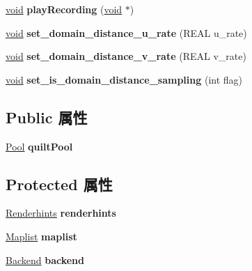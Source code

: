 \begin{DoxyCompactItemize}
\mbox{\label{class_nurbs_tessellator_af11cca8f0872b96b47293b6f3d2e7e24}} 
\hyperlink{interfacevoid}{void} {\bfseries play\+Recording} (\hyperlink{interfacevoid}{void} $\ast$)
\item 
\mbox{\label{class_nurbs_tessellator_abe08fb7d023c4ba7409fba609c70cad8}} 
\hyperlink{interfacevoid}{void} {\bfseries set\+\_\+domain\+\_\+distance\+\_\+u\+\_\+rate} (R\+E\+AL u\+\_\+rate)
\item 
\mbox{\label{class_nurbs_tessellator_a04156adf71bc8b5a5a413915bf0cff02}} 
\hyperlink{interfacevoid}{void} {\bfseries set\+\_\+domain\+\_\+distance\+\_\+v\+\_\+rate} (R\+E\+AL v\+\_\+rate)
\item 
\mbox{\label{class_nurbs_tessellator_ab3ec13f9d14a6babf2c77566149b6e0a}} 
\hyperlink{interfacevoid}{void} {\bfseries set\+\_\+is\+\_\+domain\+\_\+distance\+\_\+sampling} (int flag)
\end{DoxyCompactItemize}
\subsection*{Public 属性}
\begin{DoxyCompactItemize}
\item 
\mbox{\label{class_nurbs_tessellator_a4fffa97d2390f3d1602a33a65bdc4118}} 
\hyperlink{class_pool}{Pool} {\bfseries quilt\+Pool}
\end{DoxyCompactItemize}
\subsection*{Protected 属性}
\begin{DoxyCompactItemize}
\item 
\mbox{\label{class_nurbs_tessellator_ab8e7a3e4be99cdc3dc4c01b0e72b5609}} 
\hyperlink{class_renderhints}{Renderhints} {\bfseries renderhints}
\item 
\mbox{\label{class_nurbs_tessellator_ac831e93d1e9cb40d34110ce635ac4200}} 
\hyperlink{class_maplist}{Maplist} {\bfseries maplist}
\item 
\mbox{\label{class_nurbs_tessellator_a51ba776ed840b1dd4e22de3d1b293bd1}} 
\hyperlink{class_backend}{Backend} {\bfseries backend}
\end{DoxyCompactItemize}


